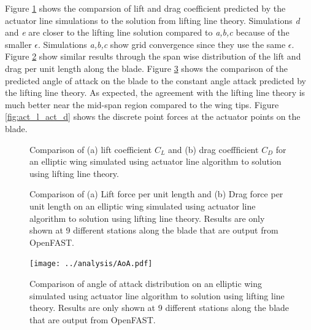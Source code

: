 \documentclass{jfm}
\begin{document}
Figure \ref{fig:CL_CD} shows the comparsion of lift and drag
coefficient predicted by the actuator line simulations to the solution
from lifting line theory. Simulations \textit{d} and \textit{e} are closer to the
lifting line solution compared to \textit{a,b,c} because of the
smaller $\epsilon$. Simulations \textit{a,b,c} show grid convergence
since they use the same $\epsilon$. Figure \ref{fig:lpul_dpul} show
similar results through the span wise distribution of the lift and
drag per unit length along the blade. Figure \ref{fig:aoa} shows the
comparison of the predicted angle of attack on the blade to the
constant angle attack predicted by the lifting line theory. As
expected, the agreement with the lifting line theory is much better near the
mid-span region compared to the wing tips. Figure \ref{fig:act_l_act_d}
shows the discrete point forces at the actuator points on the blade.

\begin{figure}
  \hfill
  \caption{Comparison of (a) lift coefficient $C_L$ and (b) drag
    coeffficient $C_D$ for an elliptic wing simulated using actuator
    line algorithm to solution using lifting line theory.}
\label{fig:CL_CD}
\end{figure}


\begin{figure}
  \hfill
  \caption{Comparison of (a) Lift force per unit length and (b) Drag force per unit
    length on an elliptic wing simulated using actuator line algorithm
  to solution using lifting line theory. Results are only shown at 9
  different stations along the blade that are output from OpenFAST.}
\label{fig:lpul_dpul}
\end{figure}

\begin{figure}
  \centerline{\texttt{[image: ../analysis/AoA.pdf]}}%
  \caption{Comparison of angle of attack distribution on an elliptic
    wing simulated using actuator line algorithm to solution using
    lifting line theory. Results are only shown at 9
  different stations along the blade that are output from OpenFAST.}
\label{fig:aoa}
\end{figure}
\end{document}
